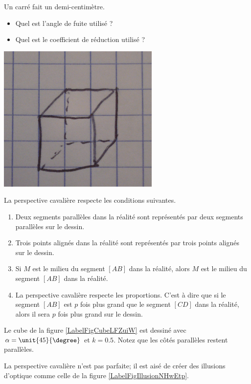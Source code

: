 \begin{minipage}{0.485\textwidth}
    Un carré fait un demi-centimètre. 
    \begin{itemize}
        \item Quel est l'angle de fuite utilisé ?
        \item Quel est le coefficient de réduction utilisé ?
    \end{itemize}
\end{minipage}
\hspace{1mm}
\begin{minipage}{0.6\textwidth}
    \center
    \includegraphics[width=0.6\textwidth]{cube_quadrill.png}
\end{minipage}

\begin{propriete}
    La perspective cavalière respecte les conditions suivantes.
    \begin{enumerate}
        \item
             Deux segments parallèles dans la réalité sont représentés par deux segments parallèles sur le dessin.
         \item
             Trois points alignés dans la réalité sont représentés par trois points alignés sur le dessin.
         \item
             Si \( M\) est le milieu du segment \( [AB]\) dans la réalité, alors \( M\) est le milieu du segment \( [AB]\) dans la réalité.
         \item
             La perspective cavalière respecte les proportions. C'est à dire que si le segment \( [AB]\) est \( p\) fois plus grand que le segment \( [CD]\) dans la réalité, alors il sera \( p\) fois plus grand sur le dessin.
    \end{enumerate}
\end{propriete}

Le cube de la figure \ref{LabelFigCubeLFZuiW} est dessiné avec \( \alpha=\unit{45}{\degree}\) et \( k=0.5\). Notez que les côtés parallèles restent parallèles.
\newcommand{\CaptionFigCubeLFZuiW}{Les segments perpendiculaires à la feuille sont de longueur moitié des autres.}


La perspective cavalière n'est pas parfaite; il est aisé de créer des illusions d'optique comme celle de la figure \ref{LabelFigIllusionNHwEtp}. %
\newcommand{\CaptionFigIllusionNHwEtp}{Une petite illusion d'optique facile.}



